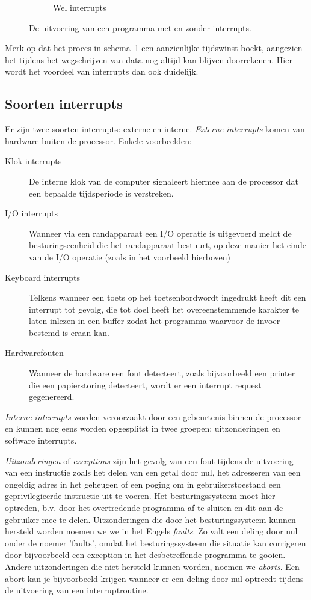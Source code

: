 \begin{figure}
\begin{subfigure}{.5\textwidth}
  \caption{Wel interrupts}
  \label{fig:progflowwithint}
\end{subfigure}
\caption{De uitvoering van een programma met en zonder interrupts.}
\label{fig:intsandnoints}
\end{figure}

Merk op dat het proces in schema~\ref{fig:progflowwithint} een aanzienlijke tijdswinst boekt, aangezien het tijdens het wegschrijven van data nog altijd kan blijven doorrekenen. Hier wordt het voordeel van interrupts dan ook duidelijk.

\subsection{Soorten interrupts}\label{sec:soorten}

Er zijn twee soorten interrupts: externe en interne.
\emph{Externe interrupts} komen van hardware buiten de
processor. Enkele voorbeelden:

\begin{description}
\item[Klok interrupts] De interne klok van de computer signaleert hiermee aan de
processor dat een bepaalde tijdsperiode is verstreken.
\item[I/O interrupts] Wanneer via een randapparaat een I/O operatie is
uitgevoerd meldt de besturingseenheid die het randapparaat
bestuurt, op deze manier het einde van de I/O operatie (zoals in het voorbeeld
hierboven)
\item[Keyboard interrupts] Telkens wanneer een toets op het toetsenbordwordt
ingedrukt heeft dit een interrupt tot gevolg, die tot doel heeft het
overeenstemmende karakter te laten inlezen in een buffer zodat het programma
waarvoor de invoer bestemd is eraan
kan.
\item[Hardwarefouten] Wanneer de hardware een fout detecteert, zoals bijvoorbeeld
 een printer die een papierstoring detecteert, wordt er een interrupt request gegenereerd.
\end{description}

\emph{Interne interrupts} worden veroorzaakt
door een gebeurtenis binnen de processor en kunnen nog eens worden
opgesplitst in twee groepen: uitzonderingen en software
interrupts.

\emph{Uitzonderingen} of \emph{exceptions} zijn het gevolg van een fout tijdens
de uitvoering van een instructie zoals het delen van een getal door
nul, het adresseren van een ongeldig adres in het geheugen of een
poging om in gebruikerstoestand een geprivilegieerde instructie uit te
voeren. Het besturingssysteem moet hier optreden, b.v. door het
overtredende programma af te sluiten en dit aan de gebruiker mee te
delen. Uitzonderingen die door het besturingssysteem kunnen hersteld worden noemen we we in
het Engels \emph{faults}. Zo valt een deling door nul onder de noemer 'faults', omdat het besturingssysteem die situatie kan corrigeren door bijvoorbeeld een exception in het desbetreffende programma te gooien. Andere uitzonderingen die niet hersteld kunnen worden, noemen we \emph{aborts}. Een abort kan je bijvoorbeeld krijgen wanneer er een deling door nul optreedt tijdens de uitvoering van een interruptroutine.

